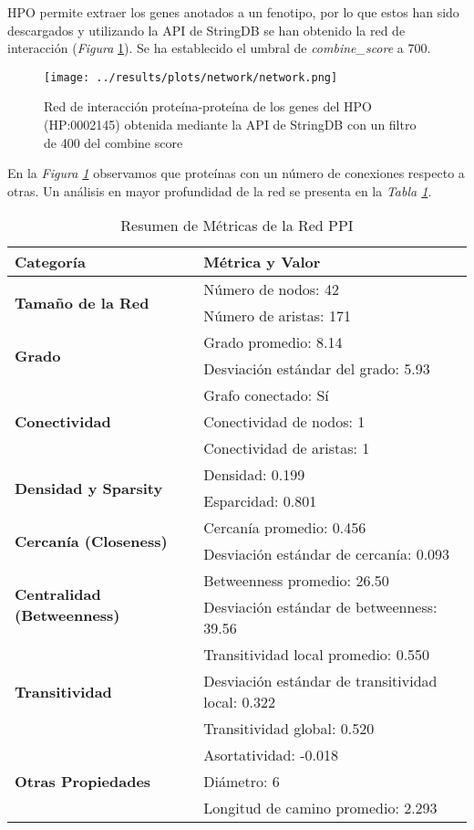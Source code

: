HPO permite extraer los genes anotados a un fenotipo, por lo que estos han sido descargados y utilizando la API de StringDB se han obtenido la red de interacción (\textit{Figura} \ref{fig:network}).
Se ha establecido el umbral de \textit{combine\_score} a 700.

\begin{figure}[h]
	\centering
	\texttt{[image: ../results/plots/network/network.png]}
	\caption{Red de interacción proteína-proteína de los genes del HPO (HP:0002145) obtenida mediante la API de StringDB con un filtro de 400 del combine score}
	\label{fig:network}
\end{figure}

En la \textit{Figura \ref{fig:network}} observamos que proteínas con un número de conexiones respecto a otras. 
Un análisis en mayor profundidad de la red se presenta en la \textit{Tabla \ref{tab:NetworkMetrics}}.


\begin{table}[h!]
	\centering
	\caption{Resumen de Métricas de la Red PPI}
	\label{tab:NetworkMetrics}
	\begin{tabular}{ll}
		\toprule
		\textbf{Categoría} & \textbf{Métrica y Valor} \\
		\midrule
		\multirow{2}{*}{\textbf{Tamaño de la Red}} 
		& Número de nodos: 42 \\
		& Número de aristas: 171 \\
		\midrule
		\multirow{2}{*}{\textbf{Grado}} 
		& Grado promedio: 8.14 \\
		& Desviación estándar del grado: 5.93 \\
		\midrule
		\multirow{3}{*}{\textbf{Conectividad}} 
		& Grafo conectado: Sí \\
		& Conectividad de nodos: 1 \\
		& Conectividad de aristas: 1 \\
		\midrule
		\multirow{2}{*}{\textbf{Densidad y Sparsity}} 
		& Densidad: 0.199 \\
		& Esparcidad: 0.801 \\
		\midrule
		\multirow{2}{*}{\textbf{Cercanía (Closeness)}} 
		& Cercanía promedio: 0.456 \\
		& Desviación estándar de cercanía: 0.093 \\
		\midrule
		\multirow{2}{*}{\textbf{Centralidad (Betweenness)}} 
		& Betweenness promedio: 26.50 \\
		& Desviación estándar de betweenness: 39.56 \\
		\midrule
		\multirow{3}{*}{\textbf{Transitividad}} 
		& Transitividad local promedio: 0.550 \\
		& Desviación estándar de transitividad local: 0.322 \\
		& Transitividad global: 0.520 \\
		\midrule
		\multirow{3}{*}{\textbf{Otras Propiedades}} 
		& Asortatividad: -0.018 \\
		& Diámetro: 6 \\
		& Longitud de camino promedio: 2.293 \\
		\bottomrule
	\end{tabular}
\end{table}

